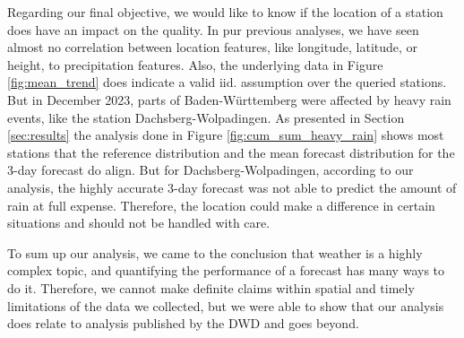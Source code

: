 \documentclass{article}
\theoremstyle{plain}
\theoremstyle{definition}
\theoremstyle{remark}
\begin{document}
Regarding our final objective, we would like to know if the location of a
station does have an impact on the quality. In pur previous analyses, we have
seen almost no correlation between location features, like longitude, latitude,
or height, to precipitation features. Also, the underlying data in Figure
\ref{fig:mean_trend} does indicate a valid iid. assumption over the queried
stations. But in December 2023, parts of Baden-Württemberg were affected by
heavy rain events, like the station Dachsberg-Wolpadingen. As presented in
Section \ref{sec:results} the analysis done in Figure
\ref{fig:cum_sum_heavy_rain} shows most stations that the reference
distribution and the mean forecast distribution for the 3-day forecast do
align. But for Dachsberg-Wolpadingen, according to our analysis, the highly
accurate 3-day forecast was not able to predict the amount of rain at full
expense. Therefore, the location could make a difference in certain situations
and should not be handled with care.

To sum up our analysis, we came to the conclusion that weather is a highly
complex topic, and quantifying the performance of a forecast has many ways to
do it. Therefore, we cannot make definite claims within spatial and timely
limitations of the data we collected, but we were able to show that our
analysis does relate to analysis published by the DWD and goes beyond.

\end{document}
